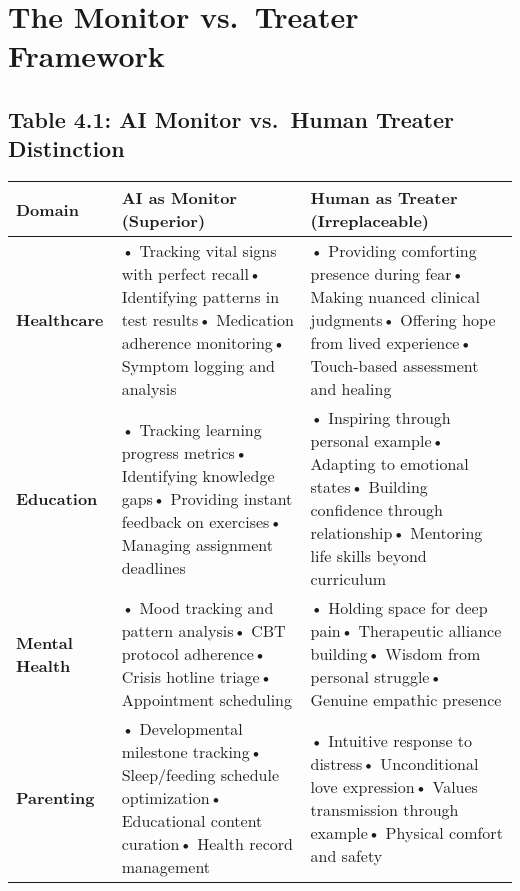 \documentclass[
  a4paper,
]{report}
\begin{document}
\section{The Monitor vs.~Treater
Framework}\label{the-monitor-vs.-treater-framework}

\subsection{Table 4.1: AI Monitor vs.~Human Treater
Distinction}\label{table-4.1-ai-monitor-vs.-human-treater-distinction}

\begin{landscape}

\begin{longtable}[]{@{}
  >{\raggedright\arraybackslash}p{}
  >{\raggedright\arraybackslash}p{}
  >{\raggedright\arraybackslash}p{}@{}}
\toprule\noalign{}
\begin{minipage}[b]{\linewidth}\raggedright
Domain
\end{minipage} & \begin{minipage}[b]{\linewidth}\raggedright
AI as Monitor (Superior)
\end{minipage} & \begin{minipage}[b]{\linewidth}\raggedright
Human as Treater (Irreplaceable)
\end{minipage} \\
\midrule\noalign{}
\endhead
\bottomrule\noalign{}
\endlastfoot
\textbf{Healthcare} & • Tracking vital signs with perfect recall•
Identifying patterns in test results• Medication adherence monitoring•
Symptom logging and analysis & • Providing comforting presence during
fear• Making nuanced clinical judgments• Offering hope from lived
experience• Touch-based assessment and healing \\
\textbf{Education} & • Tracking learning progress metrics• Identifying
knowledge gaps• Providing instant feedback on exercises• Managing
assignment deadlines & • Inspiring through personal example• Adapting to
emotional states• Building confidence through relationship• Mentoring
life skills beyond curriculum \\
\textbf{Mental Health} & • Mood tracking and pattern analysis• CBT
protocol adherence• Crisis hotline triage• Appointment scheduling & •
Holding space for deep pain• Therapeutic alliance building• Wisdom from
personal struggle• Genuine empathic presence \\
\textbf{Parenting} & • Developmental milestone tracking• Sleep/feeding
schedule optimization• Educational content curation• Health record
management & • Intuitive response to distress• Unconditional love
expression• Values transmission through example• Physical comfort and
safety \\
\end{longtable}

\end{landscape}
\end{document}
